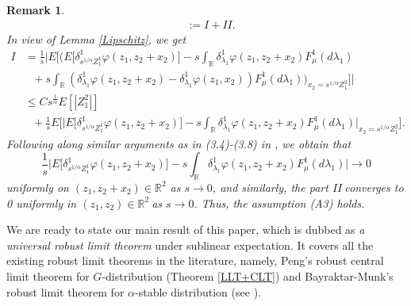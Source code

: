 \documentclass[a4paper,oneside,10pt]{article}%
\newtheorem{remark}[theorem]{Remark}
\numberwithin{equation}{section}
\begin{document}
\begin{remark}
\begin{align*}
&  :=I+II.
\end{align*}
In view of Lemma \ref{Lipschitz}, we get
\begin{align*}
I  &  =\frac{1}{s}\bigg \vert E\bigg[\bigg(E\big[\delta_{s^{1/\alpha}Z_{1}%
^{1}}^{1}\varphi(z_{1},z_{2}+x_{2})\big]-s\int_{\mathbb{R}}\delta_{\lambda
_{1}}^{1}\varphi(z_{1},z_{2}+x_{2})F_{\mu}^{1}(d\lambda_{1})\\
&  \text{ \  \ }+s\int_{\mathbb{R}}\left(  \delta_{\lambda_{1}}^{1}%
\varphi(z_{1},z_{2}+x_{2})-\delta_{\lambda_{1}}^{1}\varphi(z_{1}%
,x_{2})\right)  F_{\mu}^{1}(d\lambda_{1})\bigg)_{x_{2}=s^{1/\alpha}Z_{1}^{2}%
}\bigg]\bigg \vert \\
&  \leq Cs^{\frac{1}{\alpha}}E[|Z_{1}^{2}|]\\
&  \  \  \ +\frac{1}{s}E\bigg[\bigg \vert E\big[\delta_{s^{1/\alpha}Z_{1}^{1}%
}^{1}\varphi(z_{1},z_{2}+x_{2})\big]-s\int_{\mathbb{R}}\delta_{\lambda_{1}%
}^{1}\varphi(z_{1},z_{2}+x_{2})F_{\mu}^{1}(d\lambda_{1})\bigg \vert_{x_{2}%
=s^{1/\alpha}Z_{1}^{2}}\bigg].
\end{align*}
Following along similar arguments as in (3.4)-(3.8) in \cite{BM2016}, we
obtain that%
\[
\frac{1}{s}\bigg \vert E\big[\delta_{s^{1/\alpha}Z_{1}^{1}}^{1}\varphi
(z_{1},z_{2}+x_{2})\big]-s\int_{\mathbb{R}}\delta_{\lambda_{1}}^{1}%
\varphi(z_{1},z_{2}+x_{2})F_{\mu}^{1}(d\lambda_{1})\bigg \vert \rightarrow0
\]
uniformly on $(z_{1},z_{2}+x_{2})\in \mathbb{R}^{2}$ as $s\rightarrow0$, and
similarly, the part $II\ $converges to 0 uniformly in $(z_{1},z_{2}%
)\in \mathbb{R}^{2}\ $as $s\rightarrow0$. Thus, the assumption (A3) holds.
\end{remark}

We are ready to state our main result of this paper, which is dubbed as
\emph{a universal robust limit theorem} under sublinear expectation. It covers
all the existing robust limit theorems in the literature, namely, Peng's
robust central limit theorem for $G$-distribution (Theorem \ref{LLT+CLT}) and
Bayraktar-Munk's robust limit theorem for $\alpha$-stable distribution (see
\cite{BM2016}).
\end{document}
